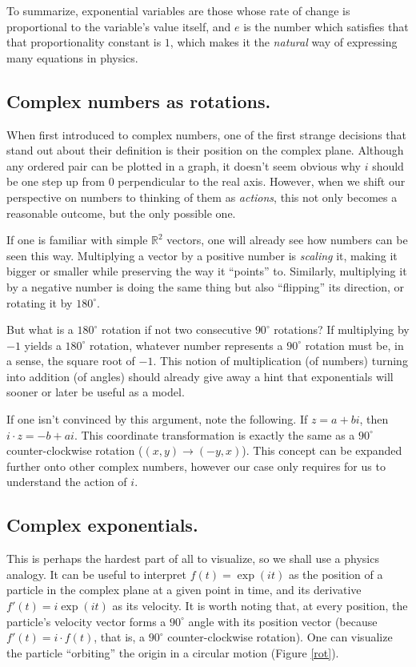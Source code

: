 To summarize, exponential variables are those whose rate of change is proportional to the variable's value itself, and $e$ is the number which satisfies that that proportionality constant is $1$, which makes it the \textit{natural} way of expressing many equations in physics.

\subsection{Complex numbers as rotations.}

When first introduced to complex numbers, one of the first strange decisions that stand out about their definition is their position on the complex plane. Although any ordered pair can be plotted in a graph, it doesn't seem obvious why $i$ should be one step up from $0$ perpendicular to the real axis. However, when we shift our perspective on numbers to thinking of them as \textit{actions}, this not only becomes a reasonable outcome, but the only possible one.

If one is familiar with simple $\mathbb{R}^2$ vectors, one will already see how numbers can be seen this way. Multiplying a vector by a positive number is \textit{scaling} it, making it bigger or smaller while preserving the way it \enquote{points} to. Similarly, multiplying it by a negative number is doing the same thing but also \enquote{flipping} its direction, or rotating it by $180^{\circ}$.

But what is a $180^{\circ}$ rotation if not two consecutive $90^{\circ}$ rotations? If multiplying by $-1$ yields a $180^{\circ}$ rotation, whatever number represents a $90^{\circ}$ rotation must be, in a sense, the square root of $-1$. This notion of multiplication (of numbers) turning into addition (of angles) should already give away a hint that exponentials will sooner or later be useful as a model.

If one isn't convinced by this argument, note the following. If $z = a + bi$, then $i\cdot z = -b + ai$. This coordinate transformation is exactly the same as a $90^{\circ}$ counter-clockwise rotation ($(x, y) \to (-y, x)$). This concept can be expanded further onto other complex numbers, however our case only requires for us to understand the action of $i$.

\subsection{Complex exponentials.}

This is perhaps the hardest part of all to visualize, so we shall use a physics analogy. It can be useful to interpret $f(t) = \exp(it)$ as the position of a particle in the complex plane at a given point in time, and its derivative $f'(t) = i\exp(it)$ as its velocity. It is worth noting that, at every position, the particle's velocity vector forms a $90^{\circ}$ angle with its position vector (because $f'(t) = i\cdot f(t)$, that is, a $90^{\circ}$ counter-clockwise rotation). One can visualize the particle \enquote{orbiting} the origin in a circular motion (Figure \ref{rot}).

